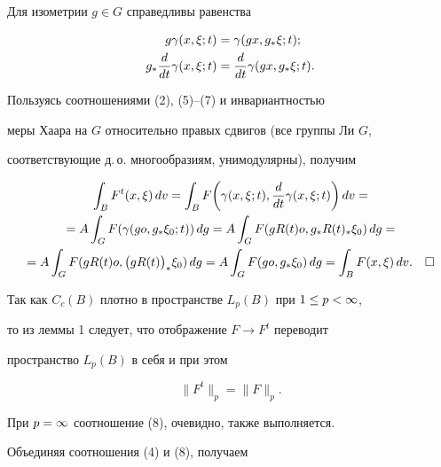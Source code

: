Для изометрии $g\in G$ справедливы равенства


\begin{align}


g\ga(x,\xi;t)&=\ga(gx,g_*\xi;t);\\


g_*\frac d{dt}\ga(x,\xi;t)&=\frac d{dt}\ga(gx,g_*\xi;t).


\end{align}


Пользуясь соотношениями (2), (5)--(7) и инвариантностью


меры Хаара на $G$ относительно правых сдвигов (все группы Ли $G$,


соответствующие д.\,о. многообразиям, унимодулярны), получим


\begin{multline*}


\int_B F^t(x,\xi)\,dv=\int_B F\bigg(\ga(x,\xi;t),\frac d{dt}\ga


(x,\xi;t)\bigg)\,dv=\\


=A\int_G F(\ga(go,g_*\xi_0;t))\,dg=


A\int_G F(gR(t)o,g_*R(t)_*\xi_0)\,dg=\\


=A\int_G F(gR(t)o,\bl gR(t)\br_*\xi_0)\,dg=


A\int_G F(go,g_*\xi_0)\,dg=


\int_B F(x,\xi)\,dv.\quad\square


\end{multline*}





Так как $C_c(B)$ плотно в пространстве $L_p(B)$ при $1\le p<\infty$,


то из леммы 1 следует, что отображение $F\to F^t$ переводит


пространство $L_p(B)$ в себя и при этом


\begin{equation}


\|F^t\|_p=\|F\|_p.


\end{equation}


При $p=\infty$ соотношение (8), очевидно, также выполняется.





Объединяя соотношения (4) и (8), получаем





